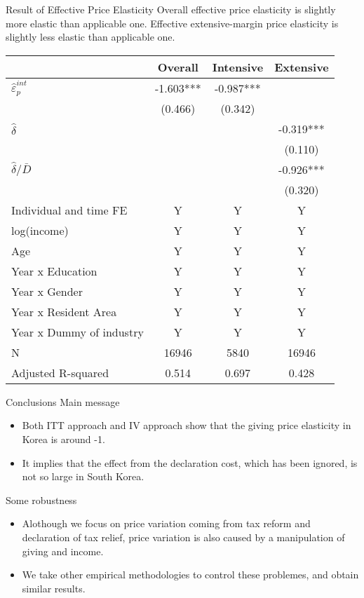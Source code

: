\documentclass[
  ignorenonframetext,
  aspectratio=169,
]{beamer}
\providecommand{\tightlist}{%
  \setlength{\itemsep}{0pt}\setlength{\parskip}{0pt}}
\begin{document}
\begin{frame}{Result of Effective Price Elasticity}
\protect\hypertarget{result-of-effective-price-elasticity}{}
Overall effective price elasticity is slightly more elastic than applicable one. Effective extensive-margin price elasticity is slightly less elastic than applicable one.

\begin{table}
\centering\begingroup\fontsize{8}{10}\selectfont

\begin{tabular}{lccc}
\toprule
 & Overall & Intensive & Extensive\\
\midrule
$\hat{\varepsilon}_p^{int}$ & -1.603*** & -0.987*** & \\
 & (0.466) & (0.342) & \\
$\hat{\delta}$ &  &  & -0.319***\\
 &  &  & (0.110)\\
$\hat{\delta}/\bar{D}$ &  &  & -0.926***\\
 &  &  & (0.320)\\
Individual and time FE & Y & Y & Y\\
log(income) & Y & Y & Y\\
Age & Y & Y & Y\\
Year x Education & Y & Y & Y\\
Year x Gender & Y & Y & Y\\
Year x Resident Area & Y & Y & Y\\
Year x Dummy of industry & Y & Y & Y\\
N & 16946 & 5840 & 16946\\
Adjusted R-squared & 0.514 & 0.697 & 0.428\\
\bottomrule
\end{tabular}
\endgroup{}
\end{table}
\end{frame}

\begin{frame}{Conclusions}
\protect\hypertarget{conclusions}{}
Main message

\begin{itemize}
\tightlist
\item
  Both ITT approach and IV approach show that the giving price elasticity in Korea is around -1.
\item
  It implies that the effect from the declaration cost, which has been ignored, is not so large in South Korea.
\end{itemize}

Some robustness

\begin{itemize}
\tightlist
\item
  Alothough we focus on price variation coming from tax reform and declaration of tax relief, price variation is also caused by a manipulation of giving and income.
\item
  We take other empirical methodologies to control these problemes, and obtain similar results.
\end{itemize}
\end{frame}
\end{document}
